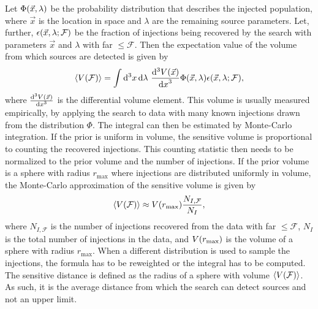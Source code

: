 Let $\Phi{\left( \vec{x}, \lambda \right)}$ be the probability distribution that describes the injected population, where $\vec{x}$ is the location in space and $\lambda$ are the remaining source parameters. Let, further, $\epsilon{\left( \vec{x}, \lambda; \mathcal{F} \right)}$ be the fraction of injections being recovered by the search with parameters $\vec{x}$ and $\lambda$ with \acrshort{far} $\leq\mathcal{F}$. Then the expectation value of the volume from which sources are detected is given by~\cite{Usman:2015kfa}
\begin{equation}
\langle V{\left( \mathcal{F} \right)}\rangle = \int \mathop{}\!\mathrm{d^3}{x}\mathop{}\!\mathrm{d}{\lambda}\ \frac{\mathop{}\!\mathrm{d^3}{V{\left( \vec{x} \right)}}}{{\mathop{}\!\mathrm{d} x}^3}\Phi{\left( \vec{x}, \lambda \right)}\epsilon{\left( \vec{x}, \lambda; \mathcal{F} \right)},
\end{equation}
where $\frac{\mathop{}\!\mathrm{d^3}{V{\left( \vec{x} \right)}}}{{\mathop{}\!\mathrm{d} x}^3}$ is the differential volume element. This volume is usually measured empirically, by applying the search to data with many known injections drawn from the distribution $\Phi$. The integral can then be estimated by Monte-Carlo integration. If the prior is uniform in volume, the sensitive volume is proportional to counting the recovered injections. This counting statistic then needs to be normalized to the prior volume and the number of injections. If the prior volume is a sphere with radius $r_\text{max}$ where injections are distributed uniformly in volume, the Monte-Carlo approximation of the sensitive volume is given by~\cite{Usman:2015kfa}
\begin{equation}
\langle V{\left( \mathcal{F} \right)}\rangle\approx V{\left( r_\text{max} \right)}\frac{N_{I, \mathcal{F}}}{N_I},
\end{equation}
where $N_{I, \mathcal{F}}$ is the number of injections recovered from the data with \acrshort{far} $\leq \mathcal{F}$, $N_I$ is the total number of injections in the data, and $V{\left( r_\text{max} \right)}$ is the volume of a sphere with radius $r_\text{max}$. When a different distribution is used to sample the injections, the formula has to be reweighted or the integral has to be computed. The sensitive distance is defined as the radius of a sphere with volume $\langle V{\left( \mathcal{F} \right)}\rangle$. As such, it is the average distance from which the search can detect sources and not an upper limit.
